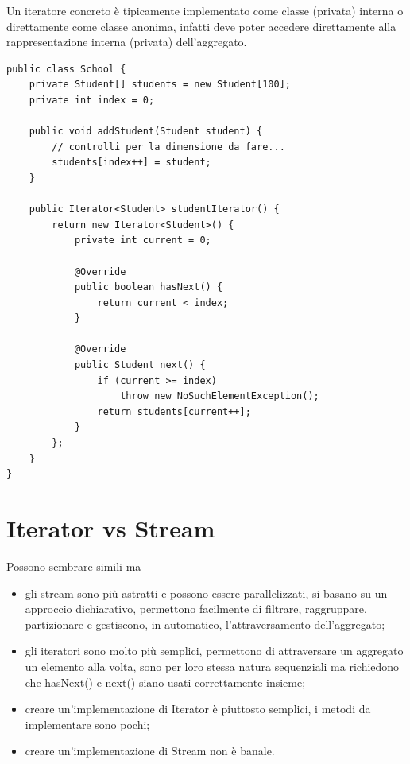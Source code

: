 Un iteratore concreto è tipicamente implementato come classe (privata) interna o direttamente come classe anonima, infatti deve poter accedere direttamente alla
rappresentazione interna (privata) dell’aggregato.
\begin{lstlisting}
public class School {
    private Student[] students = new Student[100];
    private int index = 0;
    
    public void addStudent(Student student) {
        // controlli per la dimensione da fare...
        students[index++] = student;
    }

    public Iterator<Student> studentIterator() {
        return new Iterator<Student>() {
            private int current = 0;

            @Override
            public boolean hasNext() {
                return current < index;
            }

            @Override
            public Student next() {
                if (current >= index)
                    throw new NoSuchElementException();
                return students[current++];
            }
        };
    }
}
\end{lstlisting}

\section{Iterator vs Stream}

Possono sembrare simili ma
\begin{itemize}
    \item gli stream sono più astratti e possono essere parallelizzati, si basano su un approccio dichiarativo, permettono facilmente di filtrare, raggruppare, 
    partizionare e \underline{gestiscono, in automatico, l’attraversamento dell’aggregato};
    \item gli iteratori sono molto più semplici, permettono di attraversare un aggregato un elemento alla volta, sono per loro stessa natura sequenziali ma 
    richiedono \underline{che hasNext() e next() siano usati correttamente insieme};
    \item creare un’implementazione di Iterator è piuttosto semplici, i metodi da implementare sono pochi;
    \item creare un’implementazione di Stream non è banale.
\end{itemize}